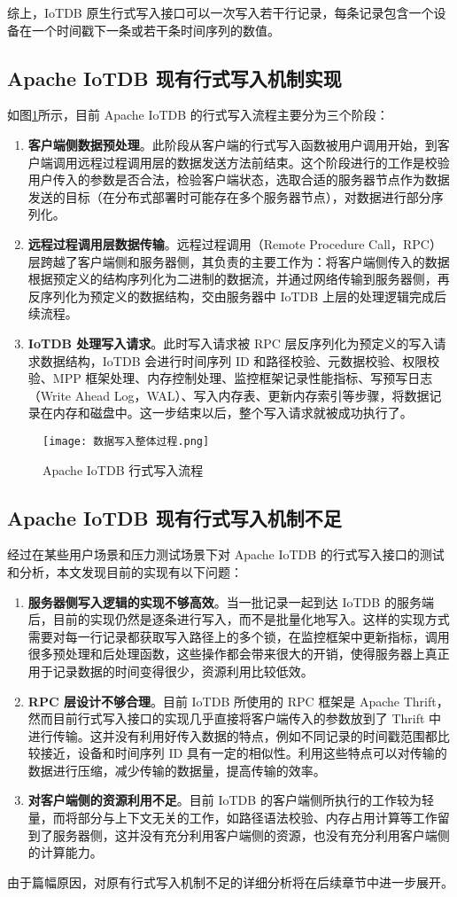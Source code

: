 综上，IoTDB 原生行式写入接口可以一次写入若干行记录，每条记录包含一个设备在一个时间戳下一条或若干条时间序列的数值。
\subsection{Apache IoTDB 现有行式写入机制实现}
如图\ref{fig:iotdb-write-process}所示，目前 Apache IoTDB 的行式写入流程主要分为三个阶段：
\begin{enumerate}
  \item \textbf{客户端侧数据预处理}。此阶段从客户端的行式写入函数被用户调用开始，到客户端调用远程过程调用层的数据发送方法前结束。这个阶段进行的工作是校验用户传入的参数是否合法，检验客户端状态，选取合适的服务器节点作为数据发送的目标（在分布式部署时可能存在多个服务器节点），对数据进行部分序列化。
  \item \textbf{远程过程调用层数据传输}。远程过程调用（Remote Procedure Call，RPC）层跨越了客户端侧和服务器侧，其负责的主要工作为：将客户端侧传入的数据根据预定义的结构序列化为二进制的数据流，并通过网络传输到服务器侧，再反序列化为预定义的数据结构，交由服务器中 IoTDB 上层的处理逻辑完成后续流程。
  \item \textbf{IoTDB 处理写入请求}。此时写入请求被 RPC 层反序列化为预定义的写入请求数据结构，IoTDB 会进行时间序列 ID 和路径校验、元数据校验、权限校验、MPP 框架处理、内存控制处理、监控框架记录性能指标、写预写日志（Write Ahead Log，WAL）、写入内存表、更新内存索引等步骤，将数据记录在内存和磁盘中。这一步结束以后，整个写入请求就被成功执行了。
\end{enumerate}
\begin{figure}
  \centering
  \texttt{[image: 数据写入整体过程.png]}
  \caption{Apache IoTDB 行式写入流程}
  \label{fig:iotdb-write-process}
\end{figure}
\subsection{Apache IoTDB 现有行式写入机制不足}
经过在某些用户场景和压力测试场景下对 Apache IoTDB 的行式写入接口的测试和分析，本文发现目前的实现有以下问题：
\begin{enumerate}
  \item \textbf{服务器侧写入逻辑的实现不够高效}。当一批记录一起到达 IoTDB 的服务端后，目前的实现仍然是逐条进行写入，而不是批量化地写入。这样的实现方式需要对每一行记录都获取写入路径上的多个锁，在监控框架中更新指标，调用很多预处理和后处理函数，这些操作都会带来很大的开销，使得服务器上真正用于记录数据的时间变得很少，资源利用比较低效。
  \item \textbf{RPC 层设计不够合理}。目前 IoTDB 所使用的 RPC 框架是 Apache Thrift，然而目前行式写入接口的实现几乎直接将客户端传入的参数放到了 Thrift 中进行传输。这并没有利用好传入数据的特点，例如不同记录的时间戳范围都比较接近，设备和时间序列 ID 具有一定的相似性。利用这些特点可以对传输的数据进行压缩，减少传输的数据量，提高传输的效率。
  \item \textbf{对客户端侧的资源利用不足}。目前 IoTDB 的客户端侧所执行的工作较为轻量，而将部分与上下文无关的工作，如路径语法校验、内存占用计算等工作留到了服务器侧，这并没有充分利用客户端侧的资源，也没有充分利用客户端侧的计算能力。
\end{enumerate}
由于篇幅原因，对原有行式写入机制不足的详细分析将在后续章节中进一步展开。
